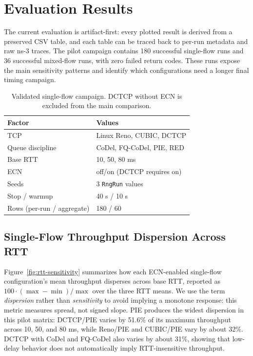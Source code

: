 \section{Evaluation Results}

The current evaluation is artifact-first: every plotted result is derived from a preserved CSV table, and each table can be traced back to per-run metadata and raw ns-3 traces. The pilot campaign contains 180 successful single-flow runs and 36 successful mixed-flow runs, with zero failed return codes. These runs expose the main sensitivity patterns and identify which configurations need a longer final timing campaign.

\begin{table}[t]
  \caption{Validated single-flow campaign. DCTCP without ECN is excluded from the main comparison.}
  \label{tab:matrix}
  \centering
  \small
  \begin{tabular}{@{}ll@{}}
    \toprule
    Factor & Values \\
    \midrule
    TCP & Linux Reno, CUBIC, DCTCP \\
    Queue discipline & CoDel, FQ-CoDel, PIE, RED \\
    Base RTT & 10, 50, 80 ms \\
    ECN & off/on (DCTCP requires on) \\
    Seeds & 3 \texttt{RngRun} values \\
    Stop / warmup & 40 s / 10 s \\
    Rows (per-run / aggregate) & 180 / 60 \\
    \bottomrule
  \end{tabular}
\end{table}

\subsection{Single-Flow Throughput Dispersion Across RTT}

Figure~\ref{fig:rtt-sensitivity} summarizes how each ECN-enabled single-flow configuration's mean throughput disperses across base RTT, reported as $100\cdot(\max-\min)/\max$ over the three RTT means. We use the term \emph{dispersion} rather than \emph{sensitivity} to avoid implying a monotone response: this metric measures spread, not signed slope. PIE produces the widest dispersion in this pilot matrix: DCTCP/PIE varies by 51.6\% of its maximum throughput across 10, 50, and 80 ms, while Reno/PIE and CUBIC/PIE vary by about 32\%. DCTCP with CoDel and FQ-CoDel also varies by about 31\%, showing that low-delay behavior does not automatically imply RTT-insensitive throughput.

